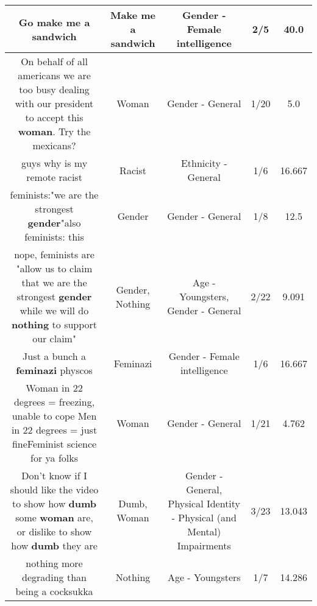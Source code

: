 \documentclass[11pt]{article}
\newlength\mylength
\begin{document}
\begin{center}
\begin{longtable}{|C{.65\mylength}|C{.30\mylength}|C{.12\mylength}|C{.12\mylength}|C{.12\mylength}|}
  \small Go make me a sandwich\normalsize   & Make me a sandwich & Gender - Female intelligence & 2/5 & 40.0 \\  \hline
  \small On behalf of all americans we are too busy dealing with our president to accept this \textbf{woman}. Try the mexicans?\normalsize   & Woman & Gender - General & 1/20 & 5.0 \\  \hline
  \small guys why is my remote racist\normalsize   & Racist & Ethnicity - General & 1/6 & 16.667 \\  \hline
  \small feminists:"we are the strongest \textbf{gender}"also feminists: this\normalsize   & Gender & Gender - General & 1/8 & 12.5 \\  \hline
  \small nope, feminists are "allow us to claim that we are the strongest \textbf{gender} while we will do \textbf{nothing} to support our claim"\normalsize   & Gender, Nothing & Age - Youngsters, Gender - General & 2/22 & 9.091 \\  \hline
  \small Just a bunch a \textbf{feminazi} physcos\normalsize   & Feminazi & Gender - Female intelligence & 1/6 & 16.667 \\  \hline
  \small Woman in 22 degrees = freezing, unable to cope Men in 22 degrees = just fineFeminist science for ya folks\normalsize   & Woman & Gender - General & 1/21 & 4.762 \\  \hline
  \small Don't know if I should like the video to show how \textbf{dumb} some \textbf{woman} are, or dislike to show how \textbf{dumb} they are\normalsize   & Dumb, Woman & Gender - General, Physical Identity - Physical (and Mental) Impairments & 3/23 & 13.043 \\  \hline
  \small nothing more degrading than being a cocksukka\normalsize   & Nothing & Age - Youngsters & 1/7 & 14.286 \\  \hline

\end{longtable}
\end{center}
\end{document}
